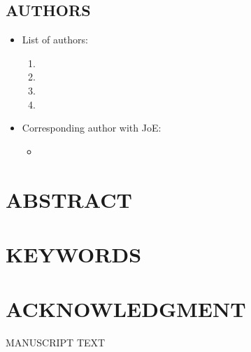 \documentclass[12pt,english]{article}
\begin{document}
\subsection*{AUTHORS}
\begin{itemize}[label={}, leftmargin=*]
    \item List of authors:
    \begin{enumerate}
        \item \AUTHORWANG
        \item \AUTHORPUENTES
        \item \AUTHORBEHRMAN
        \item \AUTHORCUNHA
    \end{enumerate}
    \item Corresponding author with JoE:
    \begin{itemize}
        \item \textbf{\AUTHORCUNHA}
    \end{itemize}
\end{itemize}
\clearpage 

\doublespacing
\section*{ABSTRACT}
\PAPERABSTRACT
\clearpage 

\doublespacing
\section*{KEYWORDS}
\PAPERKEYWORDS
\clearpage 

\doublespacing
\section*{ACKNOWLEDGMENT}
\ACKNOWLEDGMENTS
\clearpage 

\setcounter{page}{1}
\renewcommand*{\thefootnote}{\arabic{footnote}}
\begingroup
  \centering
  \Large MANUSCRIPT TEXT\\[1em]
\endgroup


\begingroup
{}
\setlength\bibitemsep{0pt}
\printbibliography[title=References for Manuscript]
\endgroup
\pagebreak



\appendix
\begin{refsection}

\end{refsection}
\end{document}
